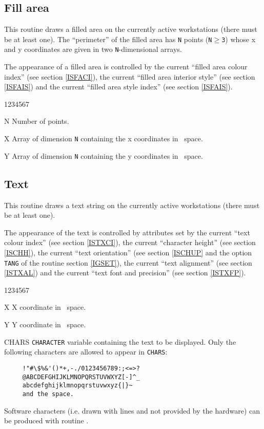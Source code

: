 \subsection{Fill area}
\Action
This routine draws a filled area on the currently active workstations (there
must be at least one). The ``perimeter'' of the filled area has {\tt N} points
({\tt N$\geq$3}) whose x and y coordinates are given in two {\tt N}-dimensional
arrays.

The appearance of a filled area is controlled by the current ``filled area
colour index'' (see  section \ref{ISFACI}), the current
``filled area interior style'' (see  section \ref{ISFAIS})
and the current ``filled area style index'' (see  section
\ref{ISFAIS}).
\Pdesc
\begin{DLtt}{1234567}
\item[N] Number of points.
\item[X] Array of dimension {\tt N} containing the x coordinates in \wc~space.
\item[Y] Array of dimension {\tt N} containing the y coordinates in \wc~space.
\end{DLtt}
%
\subsection{Text}
\Action
This routine draws a text string on the currently active workstations
(there must be at least one).

The appearance of the text is controlled by attributes set by the current ``text
colour index'' (see  section \ref{ISTXCI}), the current
``character height'' (see  section \ref{ISCHH}), the current
``text orientation'' (see  section \ref{ISCHUP} and the
option {\tt TANG} of the routine  section \ref{IGSET}), the current
``text alignment'' (see  section \ref{ISTXAL}) and the
current ``text font and precision'' (see  section
\ref{ISTXFP}).
\Pdesc
\begin{DLtt}{1234567}
\item[X] X coordinate in \wc~space.
\item[Y] Y coordinate in \wc~space.
\item[CHARS] {\tt CHARACTER} variable containing the text to be displayed.
             Only the following characters are allowed to appear in {\tt CHARS}:
\begin{verbatim}
     !"#\$%&'()*+,-./0123456789:;<=>?
     @ABCDEFGHIJKLMNOPQRSTUVWXYZ[-]^_
     abcdefghijklmnopqrstuvwxyz{|}~
     and the space.
\end{verbatim}
\end{DLtt}
Software characters (i.e. drawn with lines and not provided by the hardware) can
be produced with routine .
%
%

